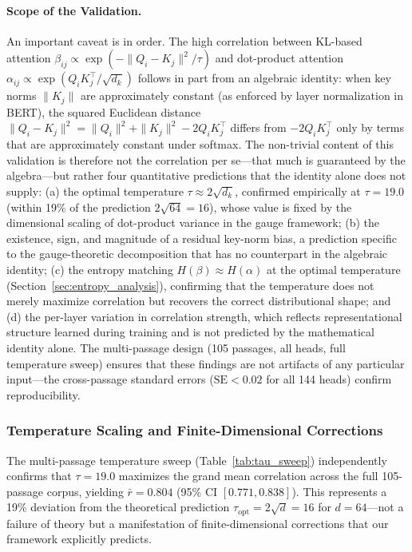 \documentclass[twoside,11pt]{article}
\begin{document}
\paragraph{Scope of the Validation.}
An important caveat is in order. The high correlation between KL-based attention $\beta_{ij} \propto \exp(-\|Q_i - K_j\|^2/\tau)$ and dot-product attention $\alpha_{ij} \propto \exp(Q_i K_j^\top / \sqrt{d_k})$ follows in part from an algebraic identity: when key norms $\|K_j\|$ are approximately constant (as enforced by layer normalization in BERT), the squared Euclidean distance $\|Q_i - K_j\|^2 = \|Q_i\|^2 + \|K_j\|^2 - 2Q_i K_j^\top$ differs from $-2Q_i K_j^\top$ only by terms that are approximately constant under softmax. The non-trivial content of this validation is therefore not the correlation per se---that much is guaranteed by the algebra---but rather four quantitative predictions that the identity alone does not supply: (a) the optimal temperature $\tau \approx 2\sqrt{d_k}$, confirmed empirically at $\tau = 19.0$ (within 19\% of the prediction $2\sqrt{64} = 16$), whose value is fixed by the dimensional scaling of dot-product variance in the gauge framework; (b) the existence, sign, and magnitude of a residual key-norm bias, a prediction specific to the gauge-theoretic decomposition that has no counterpart in the algebraic identity; (c) the entropy matching $H(\beta) \approx H(\alpha)$ at the optimal temperature (Section~\ref{sec:entropy_analysis}), confirming that the temperature does not merely maximize correlation but recovers the correct distributional shape; and (d) the per-layer variation in correlation strength, which reflects representational structure learned during training and is not predicted by the mathematical identity alone. The multi-passage design (105 passages, all heads, full temperature sweep) ensures that these findings are not artifacts of any particular input---the cross-passage standard errors ($\mathrm{SE} < 0.02$ for all 144 heads) confirm reproducibility.

\subsubsection{Temperature Scaling and Finite-Dimensional Corrections}
\label{sec:temperature_scaling}

The multi-passage temperature sweep (Table~\ref{tab:tau_sweep}) independently confirms that $\tau = 19.0$ maximizes the grand mean correlation across the full 105-passage corpus, yielding $\bar{r} = 0.804$ (95\% CI $[0.771, 0.838]$). This represents a 19\% deviation from the theoretical prediction $\tau_{\text{opt}} = 2\sqrt{d} = 16$ for $d = 64$---not a failure of theory but a manifestation of finite-dimensional corrections that our framework explicitly predicts.
\end{document}
